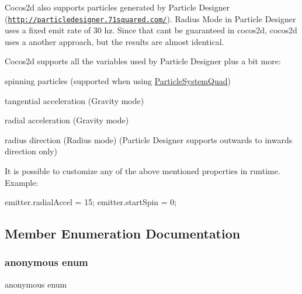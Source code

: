 Cocos2d also supports particles generated by Particle Designer (\href{http://particledesigner.71squared.com/}{\tt http\+://particledesigner.\+71squared.\+com/}). \textquotesingle{}Radius Mode\textquotesingle{} in Particle Designer uses a fixed emit rate of 30 hz. Since that can\textquotesingle{}t be guaranteed in cocos2d, cocos2d uses a another approach, but the results are almost identical.

Cocos2d supports all the variables used by Particle Designer plus a bit more\+:
\begin{DoxyItemize}
\item spinning particles (supported when using \hyperlink{classParticleSystemQuad}{Particle\+System\+Quad})
\item tangential acceleration (Gravity mode)
\item radial acceleration (Gravity mode)
\item radius direction (Radius mode) (Particle Designer supports outwards to inwards direction only)
\end{DoxyItemize}

It is possible to customize any of the above mentioned properties in runtime. Example\+:


\begin{DoxyCode}
emitter.radialAccel = 15;
emitter.startSpin = 0;
\end{DoxyCode}
 

\subsection{Member Enumeration Documentation}
\mbox{\label{classParticleSystem_a12a904f8f8560bebf1286382e5af37de}} 
\subsubsection{\texorpdfstring{anonymous enum}{anonymous enum}}
{\footnotesize\ttfamily anonymous enum}

